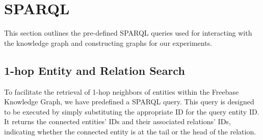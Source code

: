 \begin{table}[H]
\caption{
Statistics of the datasets used in this paper. 
$^\dagger$ denotes we randomly select 1,000 samples from the CWQ test set to create the experiment testing set due to the abundance of test samples.
$^\ast$ denotes that we utilize the 1,000 samples reported by ToG \cite{tog1.0sun2023think} to compare with the state-of-the-art.
}\label{fig:appendix:dataset}

\setlength\tabcolsep{1 pt}
\end{table}

\newpage
\section{SPARQL}\label{appendix:aparql}
This section outlines the pre-defined SPARQL queries used for interacting with the knowledge graph and constructing graphs for our experiments. 

\subsection{1-hop Entity and Relation Search}\label{appendix:1_hop_e_r_search}
To facilitate the retrieval of 1-hop neighbors of entities within the Freebase Knowledge Graph, we have predefined a SPARQL query. This query is designed to be executed by simply substituting the appropriate ID for the query entity ID. It returns the connected entities' IDs and their associated relations' IDs, indicating whether the connected entity is at the tail or the head of the relation.

